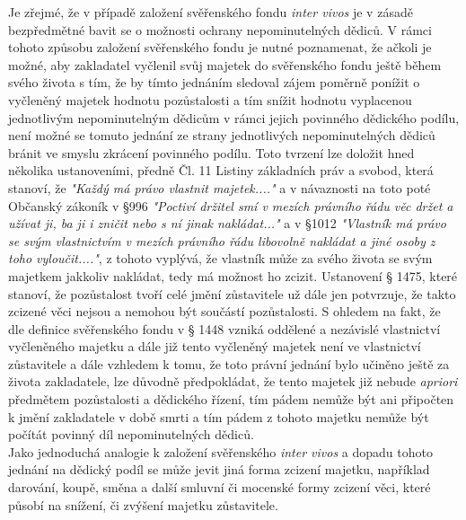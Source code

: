 \documentclass{article}
\begin{document}
Je zřejmé, že v případě založení svěřenského fondu \textit{inter vivos} je v zásadě bezpředmětné bavit se o možnosti ochrany nepominutelných dědiců. V rámci tohoto způsobu založení svěřenského fondu je nutné poznamenat, že ačkoli je možné, aby zakladatel vyčlenil svůj majetek do svěřenského fondu ještě během svého života s tím, že by tímto jednáním sledoval zájem poměrně ponížit o vyčleněný majetek hodnotu pozůstalosti a tím snížit hodnotu vyplacenou jednotlivým nepominutelným dědicům v rámci jejich povinného dědického podílu, není možné se tomuto jednání ze strany jednotlivých nepominutelných dědiců bránit ve smyslu zkrácení povinného podílu. Toto tvrzení lze doložit hned několika ustanoveními, předně Čl. 11 Listiny základních práv a svobod, která stanoví, že \textit{"Každý má právo vlastnit majetek...."} a v návaznosti na toto poté Občanský zákoník v §996 \textit{"Poctiví držitel smí v mezích právního řádu věc držet a užívat ji, ba ji i zničit nebo s ní jinak nakládat..."} a v §1012 \textit{"Vlastník má právo se svým vlastnictvím v mezích právního řádu libovolně nakládat a jiné osoby z toho vyloučit...."}, z tohoto vyplývá, že vlastník může za svého života se svým majetkem jakkoliv nakládat, tedy má možnost ho zcizit. Ustanovení § 1475, které stanoví, že pozůstalost tvoří celé jmění zůstavitele už dále jen potvrzuje, že takto zcizené věci nejsou a nemohou být součástí pozůstalosti. S ohledem na fakt, že dle definice svěřenského fondu v § 1448 vzniká oddělené a nezávislé vlastnictví vyčleněného majetku a dále již tento vyčleněný majetek není ve vlastnictví zůstavitele a dále vzhledem k tomu, že toto právní jednání bylo učiněno ještě za života zakladatele, lze důvodně předpokládat, že tento majetek již nebude \textit{apriori} předmětem pozůstalosti a dědického řízení, tím pádem nemůže být ani připočten k jmění zakladatele v době smrti a tím pádem z tohoto majetku nemůže být počítát povinný díl nepominutelných dědiců.\\



Jako jednoduchá analogie k založení svěřenského \textit{inter vivos} a dopadu tohoto jednání na dědický podíl se může jevit jiná forma zcizení majetku, například darování, koupě, směna a další smluvní či mocenské formy zcizení věci, které působí na snížení, či zvýšení majetku zůstavitele. \\
\end{document}
